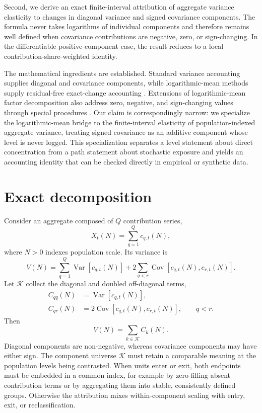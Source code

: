 {Second, we derive an exact finite-interval attribution of aggregate
variance elasticity to changes in diagonal variance and signed
covariance components. The formula never takes logarithms of individual
components and therefore remains well defined when covariance
contributions are negative, zero, or sign-changing. In the
differentiable positive-component case, the result reduces to a local
contribution-share-weighted identity.

The mathematical ingredients are established. Standard variance
accounting supplies diagonal and covariance components, while
logarithmic-mean methods supply residual-free exact-change accounting
\citep{ang2005}. Extensions of logarithmic-mean factor decomposition also
address zero, negative, and sign-changing values through special
procedures \citep{angLiu2007}. Our claim is correspondingly narrow: we
specialize the logarithmic-mean bridge to the finite-interval elasticity
of population-indexed aggregate variance, treating signed covariance as
an additive component whose level is never logged. This specialization
separates a level statement about direct concentration from a path
statement about stochastic exposure and yields an accounting identity
that can be checked directly in empirical or synthetic data.

\section{Exact decomposition}
\label{sec:exact_decomposition}

Consider an aggregate composed of $Q$ contribution series,
\begin{equation}
    X_t(N)=\sum_{q=1}^{Q}c_{q,t}(N),
\end{equation}
where $N>0$ indexes population scale. Its variance is
\begin{equation}
\label{eq:variance_accounting}
    V(N)
    =
    \sum_{q=1}^{Q}\operatorname{Var}\!\left[c_{q,t}(N)\right]
    +
    2\sum_{q<r}\operatorname{Cov}\!\left[c_{q,t}(N),c_{r,t}(N)\right].
\end{equation}
Let $\mathcal{K}$ collect the diagonal and doubled
off-diagonal terms,
\begin{align}
    C_{qq}(N)
    &=
    \operatorname{Var}\!\left[c_{q,t}(N)\right], \\
    C_{qr}(N)
    &=
    2\operatorname{Cov}\!\left[c_{q,t}(N),c_{r,t}(N)\right],
    \qquad q<r.
\end{align}
Then
\begin{equation}
\label{eq:component_sum}
    V(N)=\sum_{k\in\mathcal{K}}C_k(N).
\end{equation}
Diagonal components are non-negative, whereas covariance components may
have either sign. The component universe $\mathcal{K}$ must retain a
comparable meaning at the population levels being contrasted. When
units enter or exit, both endpoints must be embedded in a common index,
for example by zero-filling absent contribution terms or by aggregating
them into stable, consistently defined groups. Otherwise the attribution
mixes within-component scaling with entry, exit, or reclassification.

}
